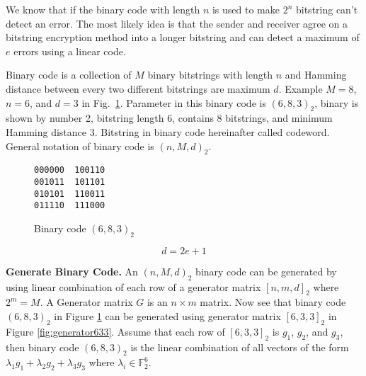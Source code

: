 \documentclass{TTP_DSL2006}
\begin{document}
We know that if the binary code with length $n$ is used to make $2^n$ bitstring can't detect an error. The most likely idea is that the sender and receiver agree on a bitstring encryption method into a longer bitstring and can detect a maximum of $e$ errors using a linear code.

Binary code is a collection of $M$ binary bitstrings with length $n$ and Hamming distance between every two different bitstrings are maximum $d$. Example $M=8$, $n=6$, and $d=3$ in Fig.~\ref{fig:binarycode683}. Parameter in this binary code is $(6,8,3)_2$, binary is shown by number 2, bitstring length 6, contains 8 bitstrings, and minimum Hamming distance 3. Bitstring in binary code hereinafter called codeword. General notation of binary code is $(n,M,d)_2$.

\begin{figure}
\centering
\begin{BVerbatim}
000000  100110
001011  101101
010101  110011
011110  111000
\end{BVerbatim}
\caption{Binary code $(6,8,3)_2$}
\label{fig:binarycode683}
\end{figure}



\begin{equation} \label{eq:de}
d = 2e + 1
\end{equation}

\noindent \textbf{Generate Binary Code.}
An $(n,M,d)_2$ binary code can be generated by using linear combination of each row of a generator matrix $[n,m,d]_2$ where $2^m = M$. A Generator matrix $G$ is an $n \times m$ matrix. Now see that binary code $(6,8,3)_2$ in Figure \ref{fig:binarycode683} can be generated using generator matrix $[6,3,3]_2$ in Figure \ref{fig:generator633}. Assume that each row of $[6,3,3]_2$ is $g_1$, $g_2$, and $g_3$, then binary code $(6,8,3)_2$ is the linear combination of all vectors of the form ${\lambda}_1 g_1 + {\lambda}_2 g_2 + {\lambda}_3 g_3$ where $\lambda{_i} \in \mathbb{F}_2^6$.
\end{document}
